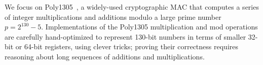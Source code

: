 \documentclass[runningheads]{llncs}
\newcommand\metafstar{Meta-F$^\star$\xspace}
\begin{document}



We focus on Poly1305~\cite{poly1305}, a widely-used cryptographic MAC
that computes a series of integer multiplications and additions modulo
a large prime number
%
$p = 2^{130} - 5$.  Implementations of the Poly1305 multiplication and
mod operations are carefully hand-optimized to represent 130-bit
numbers in terms of smaller 32-bit or 64-bit registers, using clever
tricks;
proving their correctness
requires reasoning about long sequences of
additions and multiplications.
\end{document}
